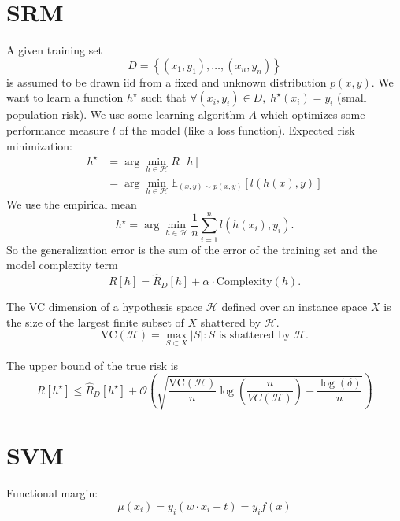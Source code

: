 \documentclass[a4paper,9pt]{extarticle}
\begin{document}
\begin{multicols*}{2}
\section{SRM}
A given training set 
\begin{equation*}
	D=\left\{(x_{1},y_{1}),\ldots,(x_{n},y_{n})\right\}
\end{equation*}
is assumed to be drawn iid from a fixed and unknown distribution $p(x,y)$. We want to learn a function $h^{\star}$ such that $\forall(x_{i},y_{i})\in D,\;h^{\star}(x_{i})=y_{i}$ (small population risk). We use some learning algorithm $A$ which optimizes some performance measure $l$ of the model (like a loss function). Expected risk minimization:
\begin{align*}
	h^{\star}&=\arg\min_{h\in\mathcal{H}}R[h]\\
	&=\arg\min_{h\in\mathcal{H}}\mathbb{E}_{(x,y)\sim p(x,y)}\left[l(h(x),y)\right]
\end{align*}
We use the empirical mean
\begin{equation*}
	h^{\star}=\arg\min_{h\in\mathcal{H}}\frac{1}{n}\sum_{i=1}^{n}l(h(x_{i}),y_{i}).
\end{equation*}
So the generalization error is the sum of the error of the training set and the model complexity term
\begin{equation*}
	R[h]=\hat{R}_{D}[h]+\alpha\cdot\text{Complexity}(h).
\end{equation*}
\begin{riquadro}[VC dimension]
	The VC dimension of a hypothesis space $\mathcal{H}$ defined over an instance space $X$ is the size of the largest finite subset of $X$ shattered by $\mathcal{H}$.
	\begin{equation*}
		\mathrm{VC}(\mathcal{H})=\max_{S\subset X}|S|:S\text{ is shattered by }\mathcal{H}.
	\end{equation*}
\end{riquadro}
The upper bound of the true risk is
\begin{equation*}
	R[h^{\star}]\leq\hat{R}_{D}[h^{\star}]+\mathcal{O}\left(\sqrt{\frac{\mathrm{VC}(\mathcal{H})}{n}\log\left(\frac{n}{VC(\mathcal{H})}\right)-\frac{\log(\delta)}{n}}\right)
\end{equation*}
\section{SVM}
Functional margin:
\begin{equation*}
	\mu(x_{i})=y_{i}(w\cdot x_{i}-t)=y_{i}f(x)
\end{equation*}

\end{multicols*}
\end{document}
